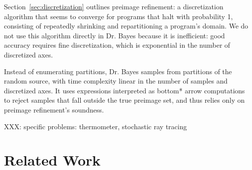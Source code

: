 \documentclass{llncs}
\begin{document}
Section~\ref{sec:discretization} outlines preimage refinement: a discretization algorithm that seems to converge for programs that halt with probability 1, consisting of repeatedly shrinking and repartitioning a program's domain.
We do not use this algorithm directly in Dr. Bayes because it is inefficient: good accuracy requires fine discretization, which is exponential in the number of discretized axes.

Instead of enumerating partitions, Dr. Bayes samples from partitions of the random source, with time complexity linear in the number of samples and discretized axes.
It uses expressions interpreted as bottom* arrow computations to reject samples that fall outside the true preimage set, and thus relies only on preimage refinement's soundness.

XXX: specific problems: thermometer, stochastic ray tracing


\section{Related Work}

\begin{comment}
Any programming language research described by the words ``bijective'' or ``reversible'' might seem to have much in common with ours.
Unfortunately, when we look more closely, we can usually draw only loose analogies and perhaps inspiration.
An example is lenses~\cite{cit:hofmann-2012popl-edit-lenses}, which are transformations from $X$ to $Y$ that can be run forward and backward, in a way that maintains some relationship between $X$ and $Y$.
Usually, a destructive, external process is assumed, so that, for example, a change from $y \in Y$ to $y' \in Y$ induces a corresponding change from $x \in X$ to some $x' \in X$.
When transformations lose information, lenses must satisfy certain behavioral laws.
In our work, no input or output is updated, and preimages are always definable regardless of non-injectivity.

Many multi-paradigm languages~\cite{cit:hanus-2007lp-multi-paradigm}, especially constraint functional languages, bear a strong resemblance to our work.
In fact, it is easy to add a $fail$ expression to our semantics, or to transform constraints into boolean program outputs.
The most obvious difference is evaluation strategy.
The most important difference is that our interpretation of programs returns \emph{distributions} of constrained outputs, rather than arbitrary single values that meet constraints.
\end{comment}
\end{document}
